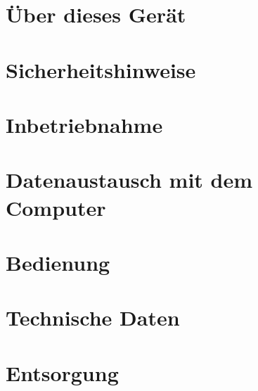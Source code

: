 \documentclass[10pt,a4paper,oneside]{99_fhnwreport_usermanual}
\begin{document}
\section{Über dieses Gerät}\label{sec:Über dieses Gerät}

\clearpage

\setcounter{page}{1}
\section{Sicherheitshinweise}\label{sec:Sicherheitshinweise}

\clearpage

\setcounter{page}{1}
\section{Inbetriebnahme}\label{sec:Inbetriebnahme}

\clearpage

\setcounter{page}{1}
\section{Datenaustausch mit dem Computer}\label{sec:Datenaustausch mit dem Computer}

\clearpage

\setcounter{page}{1}
\section{Bedienung}\label{sec:Bedienung}

\clearpage

\setcounter{page}{1}
\section{Technische Daten}\label{sec:Technische Daten}

\clearpage

\setcounter{page}{1}
\section{Entsorgung}\label{sec:Entsorgung}

\clearpage
\end{document}
